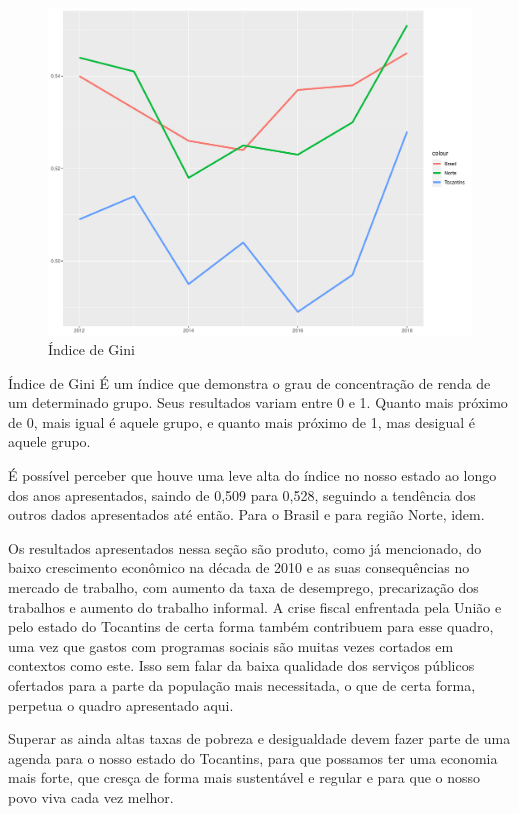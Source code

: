 \begin{figure}[h]
	\caption{Índice de Gini}
	\includegraphics[width=\linewidth]{fig/gini.pdf}
\end{figure}
\begin{smbox}[label={labelbox},nameref={Índice de Gini}]{Índice de Gini}
	É um índice que demonstra o grau de concentração de renda de um determinado grupo. Seus resultados variam entre 0 e 1. Quanto mais próximo de 0, mais igual é aquele grupo, e quanto mais próximo de 1, mas desigual é aquele grupo.
\end{smbox}
\par É possível perceber que houve uma leve alta do índice no nosso estado ao longo dos anos apresentados, saindo de 0,509 para 0,528, seguindo a tendência dos outros dados apresentados até então. Para o Brasil e para região Norte, idem. 
\par Os resultados apresentados nessa seção são produto, como já mencionado, do baixo crescimento econômico na década de 2010 e as suas consequências no mercado de trabalho, com aumento da taxa de desemprego, precarização dos trabalhos e aumento do trabalho informal. A crise fiscal enfrentada pela União e pelo estado do Tocantins de certa forma também contribuem para esse quadro, uma vez que gastos com programas sociais são muitas vezes cortados em contextos como este. Isso sem falar da baixa qualidade dos serviços públicos ofertados para a parte da população mais necessitada, o que de certa forma, perpetua o quadro apresentado aqui.
\par Superar as ainda altas taxas de pobreza e desigualdade devem fazer parte de uma agenda para o nosso estado do Tocantins, para que possamos ter uma economia mais forte, que cresça de forma mais sustentável e regular e para que o nosso povo viva cada vez melhor.  
